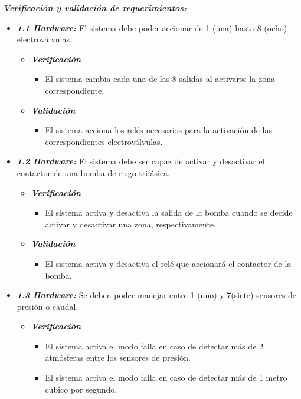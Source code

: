 \documentclass[11pt]{charter}
\begin{document}
\textit{\textbf{Verificación y validación de requerimientos:}}
\begin{itemize}
	\item \textit{\textbf{1.1 Hardware:}} El sistema debe poder accionar de 1 (una) hasta 8 (ocho) electroválvulas.
	\begin{itemize}
		
		\item \textit{ \textbf{Verificación}}
		\begin{itemize}
			\item El sistema cambia cada una de las 8 salidas al activarse la zona correspondiente.
		\end{itemize}
		
		\item \textit{\textbf{Validación}}
		\begin{itemize}
			\item El sistema acciona los relés necesarios para la activación de las correspondientes electroválvulas. 			
		\end{itemize}
	\end{itemize}
	
	\item \textit{\textbf{1.2 Hardware:}} El sistema debe ser capaz de activar y desactivar el contactor de una bomba de riego trifásica.
	\begin{itemize}
		\item \textit{ \textbf{Verificación}}
		\begin{itemize}
			\item El sistema activa y desactiva la salida de la bomba cuando se decide activar y desactivar una zona, respectivamente.
		\end{itemize}
		
		\item \textit{\textbf{Validación}}
		\begin{itemize}
			\item El sistema activa y desactiva el relé que accionará el contactor de la bomba.
		\end{itemize}
	\end{itemize}

\clearpage
	\item \textit{\textbf{1.3 Hardware:}} Se deben poder manejar entre 1 (uno) y 7(siete) sensores de presión o caudal.
	\begin{itemize}
		\item \textit{ \textbf{Verificación}} 
		\begin{itemize}
			\item El sistema activa el modo falla en caso de detectar más de 2 atmósferas entre los sensores de presión.
			\item El sistema activa el modo falla en caso de detectar más de 1 metro cúbico por segundo.
		\end{itemize}


\end{itemize}
\end{itemize}
\end{document}
